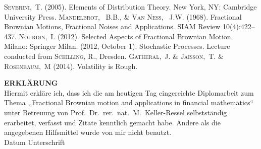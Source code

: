 \documentclass[a4paper, twoside, 11pt]{article}
\theoremstyle{definition}
\begin{document}
\begin{thebibliography}{99}
	\textsc{Severini,~T.} (2005). Elements of Distribution Theory. New York, NY: Cambridge University Press.
	 \textsc{Mandelbrot, ~B.B., \& Van Ness, ~J.W.} (1968). Fractional Brownian Motions, Fractional Noises and Applications. SIAM Review 10(4):422–437.
	 \textsc{Nourdin,~I.} (2012). Selected Aspects of Fractional Brownian Motion. Milano: Springer Milan.
	 (2012, October 1). Stochastic Processes. Lecture conducted from \textsc{Schilling, R.}, Dresden.
	 \textsc{Gatheral,~J. \& Jaisson,~T. \& Rosenbaum,~M} (2014). Volatility is Rough.

\end{thebibliography}

\newpage
\thispagestyle{empty}
\Large
\textbf{ERKL\"ARUNG} \\[1em]
\large
Hiermit erkl\"are ich, dass ich die am heutigen Tag eingereichte Diplomarbeit zum Thema ,,Fractional Brownian motion and applications in financial mathematics`` unter Betreuung von Prof.\ Dr.\ rer.\ nat.\ M.\ Keller-Ressel selbstst\"andig erarbeitet, verfasst und Zitate kenntlich gemacht habe. Andere als die angegebenen Hilfsmittel wurde von mir nicht benutzt. \\[5em]
\vspace{2cm}
\large
Datum \hfill Unterschrift 
\end{document}
